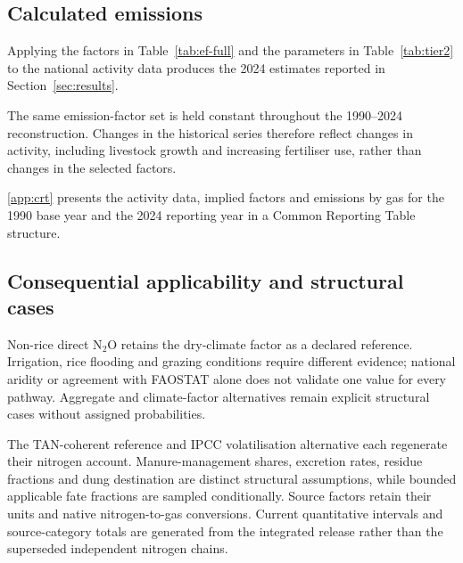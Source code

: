 \subsection{Calculated emissions}

Applying the factors in Table~\ref{tab:ef-full} and the parameters in
Table~\ref{tab:tier2} to the national activity data produces the 2024 estimates reported in
Section~\ref{sec:results}.

The same emission-factor set is held constant throughout the 1990--2024 reconstruction.
Changes in the historical series therefore reflect changes in activity, including livestock
growth and increasing fertiliser use, rather than changes in the selected factors.

\ref{app:crt} presents the activity data, implied factors and emissions by gas for
the 1990 base year and the 2024 reporting year in a Common Reporting Table structure.

\subsection{Consequential applicability and structural cases}\label{sec:sensitivity}
Non-rice direct N$_2$O retains the dry-climate factor as a declared reference. Irrigation, rice flooding and grazing conditions require different evidence; national aridity or agreement with FAOSTAT alone does not validate one value for every pathway. Aggregate and climate-factor alternatives remain explicit structural cases without assigned probabilities.

The TAN-coherent reference and IPCC volatilisation alternative each regenerate their nitrogen account. Manure-management shares, excretion rates, residue fractions and dung destination are distinct structural assumptions, while bounded applicable fate fractions are sampled conditionally. Source factors retain their units and native nitrogen-to-gas conversions. Current quantitative intervals and source-category totals are generated from the integrated release rather than the superseded independent nitrogen chains.
